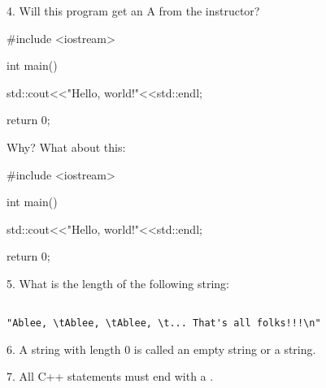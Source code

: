 4. Will this program get an A from the instructor?
\begin{console}
#include <iostream>

int main()
{
    std::cout<<"Hello, world!"<<std::endl;

    return 0;
}
\end{console}
Why? What about this:
\begin{console}
#include <iostream>

int main()
{


    std::cout<<"Hello, world!"<<std::endl;


    return 0;
}
\end{console}

5. What is the length of the following string:
\begin{verbatim}

"Ablee, \tAblee, \tAblee, \t... That's all folks!!!\n"

\end{verbatim}

6. A string with length 0 is called an empty string or a
   \underline{\mbox{}\hspace{1in}} string.

7. All C++ statements must end with a 
   \underline{\mbox{}\hspace{2in}}.
   
